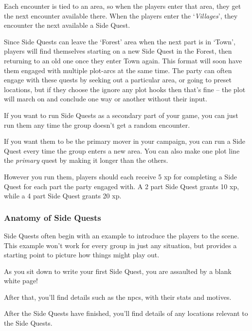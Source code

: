 \begin{multicols}{2}
Each encounter is tied to an area, so when the players enter that area, they get the next encounter available there.
When the players enter the `\emph{Villages}', they encounter the next available a Side Quest.

Since Side Quests can leave the `Forest' area when the next part is in `Town', players will find themselves starting on a new Side Quest in the Forest, then returning to an old one once they enter Town again.
This format will soon have them engaged with multiple plot-arcs at the same time.
The party can often engage with these quests by seeking out a particular area, or going to preset locations, but if they choose the ignore any plot hooks then that's fine -- the plot will march on and conclude one way or another without their input.

If you want to run Side Quests as a secondary part of your game, you can just run them any time the group doesn't get a random encounter.

If you want them to be the primary mover in your campaign, you can run a Side Quest every time the group enters a new area.
You can also make one plot line the \emph{primary} quest by making it longer than the others.

However you run them, players should each receive 5 \gls{xp} for completing a Side Quest for each part the party engaged with.
A 2 part Side Quest grants 10 \gls{xp}, while a 4 part Side Quest grants 20 \gls{xp}.

\subsubsection{Anatomy of Side Quests}

Side Quests often begin with an example to introduce the players to the scene.
This example won't work for every group in just any situation, but provides a starting point to picture how things might play out.

\begin{boxtext}

	As you sit down to write your first Side Quest, you are assaulted by a blank white page!

\end{boxtext}

After that, you'll find details such as the \glspl{npc}, with their stats and motives.

After the Side Quests have finished, you'll find details of any locations relevant to the Side Quests.


\end{multicols}
